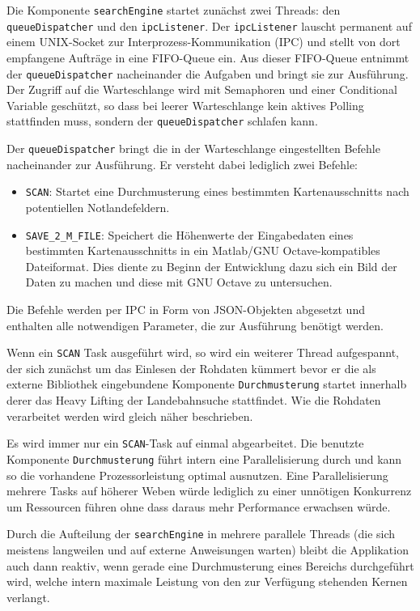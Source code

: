 \documentclass[10pt,a4paper]{report}
\begin{document}
Die Komponente \texttt{searchEngine} startet zunächst zwei Threads: den \verb|queueDispatcher| und den \verb|ipcListener|. Der  \verb|ipcListener| lauscht permanent auf einem UNIX-Socket zur Interprozess-Kommunikation (IPC) und stellt von dort empfangene Aufträge in eine FIFO-Queue ein. Aus dieser FIFO-Queue entnimmt der \verb|queueDispatcher| nacheinander die Aufgaben und bringt sie zur Ausführung. Der Zugriff auf die Warteschlange wird mit Semaphoren und einer Conditional Variable geschützt, so dass bei leerer Warteschlange kein aktives Polling stattfinden muss, sondern der \verb|queueDispatcher| schlafen kann.

Der \verb|queueDispatcher| bringt die in der Warteschlange eingestellten Befehle nacheinander zur Ausführung. Er versteht dabei lediglich zwei Befehle: 
\begin{itemize}
	\item \verb|SCAN|: Startet eine Durchmusterung eines bestimmten Kartenausschnitts nach potentiellen Notlandefeldern.
	\item \verb|SAVE_2_M_FILE|: Speichert die Höhenwerte der Eingabedaten eines bestimmten Kartenausschnitts in ein Matlab/GNU Octave-kompatibles Dateiformat. Dies diente zu Beginn der Entwicklung dazu sich ein Bild der Daten zu machen und diese mit GNU Octave zu untersuchen.
\end{itemize}
Die Befehle werden per IPC in Form von JSON-Objekten abgesetzt und enthalten alle notwendigen Parameter, die zur Ausführung benötigt werden.

Wenn ein \verb|SCAN| Task ausgeführt wird, so wird ein weiterer Thread aufgespannt, der sich zunächst um das Einlesen der Rohdaten kümmert bevor er die als externe Bibliothek eingebundene Komponente \texttt{Durchmusterung} startet innerhalb derer das Heavy Lifting der Landebahnsuche stattfindet. Wie die Rohdaten verarbeitet werden wird gleich näher beschrieben.

Es wird immer nur ein \verb|SCAN|-Task auf einmal abgearbeitet. Die benutzte Komponente \texttt{Durchmusterung} führt intern eine Parallelisierung durch und kann so die vorhandene Prozessorleistung optimal ausnutzen. Eine Parallelisierung mehrere Tasks auf höherer Weben würde lediglich zu einer unnötigen Konkurrenz um Ressourcen führen ohne dass daraus mehr Performance erwachsen würde.

Durch die Aufteilung der \texttt{searchEngine} in mehrere parallele Threads (die sich meistens langweilen und auf externe Anweisungen warten) bleibt die Applikation auch dann reaktiv, wenn gerade eine Durchmusterung eines Bereichs durchgeführt wird, welche intern maximale Leistung von den zur Verfügung stehenden Kernen verlangt.
\end{document}
